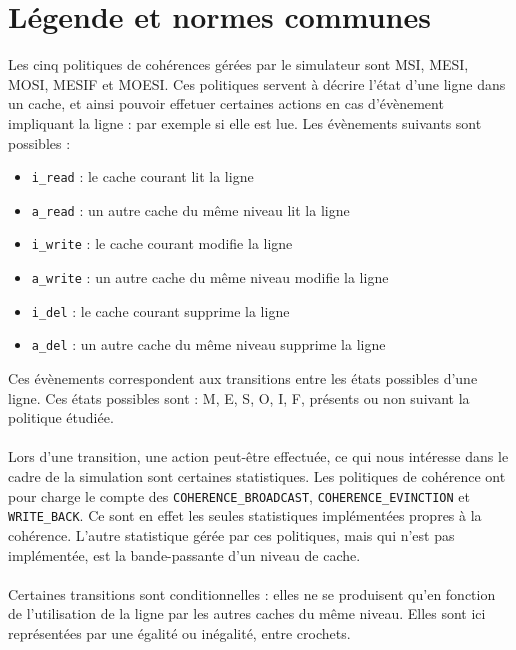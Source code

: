 \section{Légende et normes communes}

Les cinq politiques de cohérences gérées par le simulateur sont MSI, MESI, MOSI, MESIF et MOESI. Ces politiques servent à décrire l'état d'une ligne dans un cache, et ainsi pouvoir effetuer certaines actions en cas d'évènement impliquant la ligne : par exemple si elle est lue. Les évènements suivants sont possibles :
\begin{itemize}
\item{\verb!i_read! : le cache courant lit la ligne}
\item{\verb!a_read! : un autre cache du même niveau lit la ligne}
\item{\verb!i_write! : le cache courant modifie la ligne}
\item{\verb!a_write! : un autre cache du même niveau modifie la ligne}
\item{\verb!i_del! : le cache courant supprime la ligne}
\item{\verb!a_del! : un autre cache du même niveau supprime la ligne}\\
\end{itemize}
Ces évènements correspondent aux transitions entre les états possibles d'une ligne. Ces états possibles sont : M, E, S, O, I, F, présents ou non suivant la politique étudiée.

\paragraph{}
Lors d'une transition, une action peut-être effectuée, ce qui nous intéresse dans le cadre de la simulation sont certaines statistiques. Les politiques de cohérence ont pour charge le compte des \verb!COHERENCE_BROADCAST!, \verb!COHERENCE_EVINCTION! et \verb!WRITE_BACK!. Ce sont en effet les seules statistiques implémentées propres à la cohérence. L'autre statistique gérée par ces politiques, mais qui n'est pas implémentée, est la bande-passante d'un niveau de cache. 

\paragraph{}
Certaines transitions sont conditionnelles : elles ne se produisent qu'en fonction de l'utilisation de la ligne par les autres caches du même niveau. Elles sont ici représentées par une égalité ou inégalité, entre crochets.

